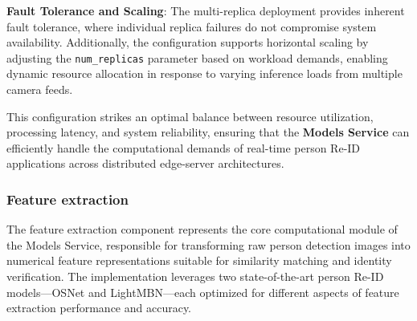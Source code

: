 \textbf{Fault Tolerance and Scaling}: The multi-replica deployment provides inherent fault tolerance, where individual replica failures do not compromise system availability. Additionally, the configuration supports horizontal scaling by adjusting the \texttt{num\_replicas} parameter based on workload demands, enabling dynamic resource allocation in response to varying inference loads from multiple camera feeds.

This configuration strikes an optimal balance between resource utilization, processing latency, and system reliability, ensuring that the \textbf{Models Service} can efficiently handle the computational demands of real-time person Re-ID applications across distributed edge-server architectures.

\subsubsection{Feature extraction}

The feature extraction component represents the core computational module of the Models Service, responsible for transforming raw person detection images into numerical feature representations suitable for similarity matching and identity verification. The implementation leverages two state-of-the-art person Re-ID models—OSNet and LightMBN—each optimized for different aspects of feature extraction performance and accuracy.

